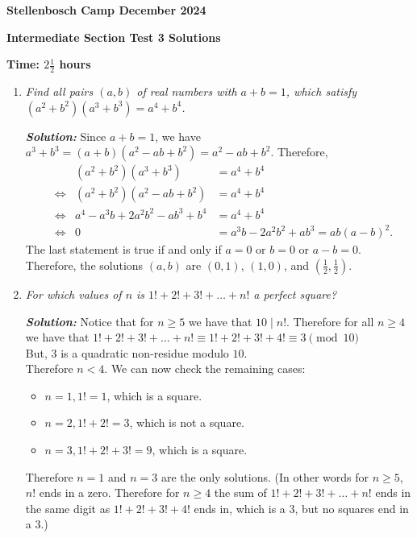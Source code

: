 \documentclass[12pt]{article}
\newcommand{\sol}{\textbf{\textit{Solution: }}}
\begin{document}
\begin{center} \large
\textbf{Stellenbosch Camp December 2024}

\textbf{Intermediate Section Test 3 Solutions}

\textbf{Time: \(2 \frac{1}{2}\) hours}
\end{center}

\begin{enumerate}[topsep=2\bigskipamount,itemsep=\bigskipamount]
\item \textit{Find all pairs $(a,b)$ of real numbers with $a+b = 1$, which satisfy $(a^2+b^2)(a^3+b^3)=a^4+b^4$.}

\sol Since \(a + b = 1\), we have \(a^{3} + b^{3} = (a + b)(a^{2} - ab + b^{2}) = a^{2} - ab + b^{2}\). Therefore,
\[\begin{aligned}
& & (a^{2} + b^{2})(a^{3} + b^{3}) & = a^{4} + b^{4}\\
& \iff & (a^{2} + b^{2})(a^{2} - ab + b^{2}) & = a^{4} + b^{4}\\
& \iff & a^{4} - a^{3}b + 2a^{2}b^{2} - ab^{3} + b^{4} & = a^{4} + b^{4}\\
& \iff & 0 & = a^{3}b - 2a^{2}b^{2} + ab^{3} = ab(a - b)^{2}.
\end{aligned}\]
The last statement is true if and only if \(a = 0\) or \(b = 0\) or \(a - b = 0\). Therefore, the solutions \((a, b)\) are \((0, 1)\), \((1, 0)\), and \((\frac{1}{2}, \frac{1}{2})\).

\item \textit{For which values of $n$ is $1! + 2! + 3! + \dots + n!$ a perfect square?}

\sol Notice that for $n\geqslant5$ we have that $10\mid n!$. Therefore for all $n\geqslant 4$ we have that $1!+2!+3!+\dots+n!\equiv 1!+2!+3!+4!\equiv 3 \pmod{10}$\\ But, $3$ is a quadratic non-residue modulo $10$.\\
Therefore $n<4$. We can now check the remaining cases:
\begin{itemize}
    \item $n=1, 1!=1$, which is a square.
    \item $n=2, 1!+2!=3$, which is not a square.
    \item $n=3, 1!+2!+3!=9$, which is a square.
\end{itemize}
Therefore $n=1$ and $n=3$ are the only solutions.
(In other words for $n\geqslant 5$, $n!$ ends in a zero. Therefore for $n\geqslant4$ the sum of $1!+2!+3!+\dots+n!$ ends in the same digit as $1!+2!+3!+4!$ ends in, which is a $3$, but no squares end in a $3$.)


\end{enumerate}
\end{document}
